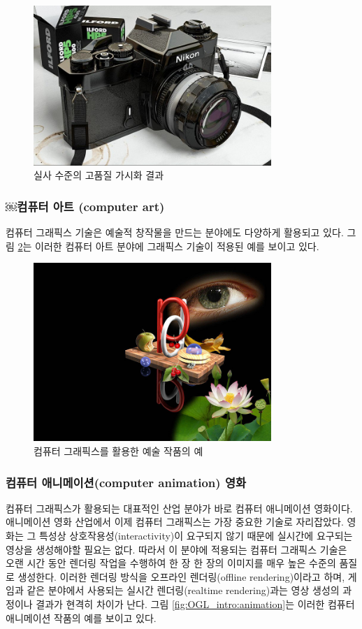 \begin{figure}[h!]
  \centering
    \includegraphics[width=9cm]{OGL_intro/photorealistic.jpg}
    \caption{실사 수준의 고품질 가시화 결과}
    \label{fig:OGL_intro:photorealistic}
\end{figure}

\subsubsection{￼컴퓨터 아트 (computer art)}

컴퓨터 그래픽스 기술은 예술적 창작물을 만드는 분야에도 다양하게 활용되고 있다. 그림 \ref{fig:OGL_intro:art}는 이러한 컴퓨터 아트 분야에 그래픽스 기술이 적용된 예를 보이고 있다. 

\begin{figure}[h!]
  \centering
    \includegraphics[width=9cm]{OGL_intro/computerArt.jpg}
    \caption{컴퓨터 그래픽스를 활용한 예술 작품의 예}
    \label{fig:OGL_intro:art}
\end{figure}

\subsubsection{컴퓨터 애니메이션(computer animation) 영화}

컴퓨터 그래픽스가 활용되는 대표적인 산업 분야가 바로 컴퓨터 애니메이션 영화이다. 애니메이션 영화 산업에서 이제 컴퓨터 그래픽스는 가장 중요한 기술로 자리잡았다. 영화는 그 특성상 상호작용성(interactivity)이 요구되지 않기 때문에 실시간에 요구되는 영상을 생성해야할 필요는 없다. 따라서 이 분야에 적용되는 컴퓨터 그래픽스 기술은 오랜 시간 동안 렌더링 작업을 수행하여 한 장 한 장의 이미지를 매우 높은 수준의 품질로 생성한다. 이러한 렌더링 방식을 오프라인 렌더링(offline rendering)이라고 하며, 게임과 같은 분야에서 사용되는 실시간 렌더링(realtime rendering)과는 영상 생성의 과정이나 결과가 현격히 차이가 난다. 그림 \ref{fig:OGL_intro:animation}는 이러한 컴퓨터 애니메이션 작품의 예를 보이고 있다.


